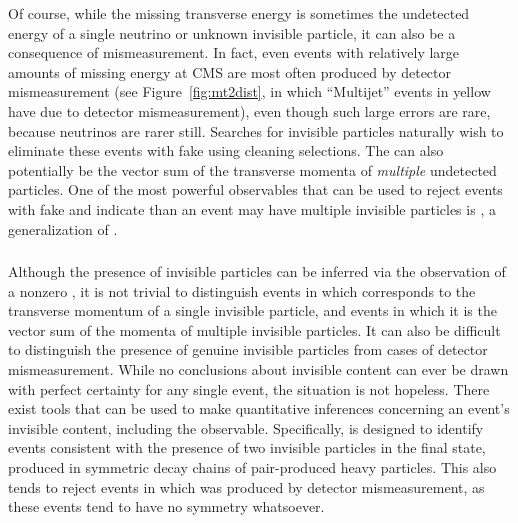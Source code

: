   Of course, while the missing transverse energy is sometimes the undetected energy of a single neutrino or unknown invisible particle, it can also be a consequence of mismeasurement.
  In fact, even events with relatively large amounts of missing energy at CMS are most often produced by detector mismeasurement (see Figure~\ref{fig:mt2dist}, in which ``Multijet'' events in yellow have \met due to detector mismeasurement), even though such large errors are rare, because neutrinos are rarer still.
  Searches for invisible particles naturally wish to eliminate these events with fake \met using cleaning selections.
  The \met can also potentially be the vector sum of the transverse momenta of {\it multiple} undetected particles.
  One of the most powerful observables that can be used to reject events with fake \met and indicate than an event may have multiple invisible particles is \mttwo \cite{mt2}, a generalization of \Mt.

    \subsubsection{\mttwo} \label{sec:MT2}

    Although the presence of invisible particles can be inferred via the observation of a nonzero \vMet, it is not trivial to distinguish events in which \vMet corresponds to the transverse momentum of a single invisible particle, and events in which it is the vector sum of the momenta of multiple invisible particles.
    It can also be difficult to distinguish the presence of genuine invisible particles from cases of detector mismeasurement.
    While no conclusions about invisible content can ever be drawn with perfect certainty for any single event, the situation is not hopeless.
    There exist tools that can be used to make quantitative inferences concerning an event's invisible content, including the \mttwo observable.
    Specifically, \mttwo is designed to identify events consistent with the presence of two invisible particles in the final state, produced in symmetric decay chains of pair-produced heavy particles.
    This also tends to reject events in which \met was produced by detector mismeasurement, as these events tend to have no symmetry whatsoever.

